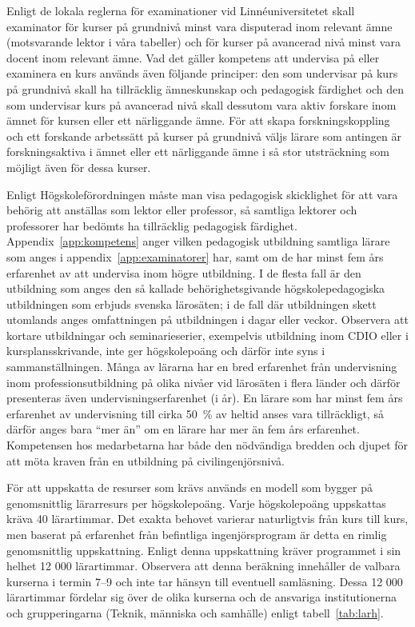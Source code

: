 Enligt de lokala reglerna för examinationer vid Linnéuniversitetet skall examinator för kurser på grundnivå minst vara disputerad inom relevant ämne (motsvarande lektor i våra tabeller) och för kurser på avancerad nivå minst vara docent inom relevant ämne. Vad det gäller kompetens att undervisa på eller examinera en kurs används även följande principer: den som undervisar på kurs på grundnivå skall ha tillräcklig ämneskunskap och pedagogisk färdighet och den som undervisar kurs på avancerad nivå skall dessutom vara aktiv forskare inom ämnet för kursen eller ett närliggande ämne. För att skapa forskningskoppling och ett forskande arbetssätt på kurser på grundnivå väljs lärare som antingen är forskningsaktiva i ämnet eller ett närliggande ämne i så stor utsträckning som möjligt även för dessa kurser.

Enligt Högskoleförordningen måste man visa pedagogisk skicklighet för att vara behörig att anställas som lektor eller professor, så samtliga lektorer och professorer har bedömts ha tillräcklig pedagogisk färdighet. Appendix~\ref{app:kompetens} anger vilken pedagogisk utbildning samtliga lärare som anges i appendix~\ref{app:examinatorer} har, samt om de har minst fem års erfarenhet av att undervisa inom högre utbildning. I de flesta fall är den utbildning som anges den så kallade behörighetsgivande högskolepedagogiska utbildningen som erbjuds svenska lärosäten; i de fall där utbildningen skett utomlands anges omfattningen på utbildningen i dagar eller veckor. Observera att kortare utbildningar och seminarieserier, exempelvis utbildning inom CDIO eller i kursplansskrivande, inte ger högskolepoäng och därför inte syns i sammanställningen. Många av lärarna har en bred erfarenhet från undervisning inom professionsutbildning på olika nivåer vid lärosäten i flera länder och därför presenteras även undervisningserfarenhet (i år). En lärare som har minst fem års erfarenhet av undervisning till cirka 50~\% av heltid anses vara tillräckligt, så därför anges bara ``mer än'' om en lärare har mer än fem års erfarenhet. Kompetensen hos medarbetarna har både den nödvändiga bredden och djupet för att möta kraven från en utbildning på civilingenjörsnivå.

För att uppskatta de resurser som krävs används en modell som bygger på genomsnittlig lärarresurs per högskolepoäng. Varje högskolepoäng uppskattas kräva 40 lärartimmar. Det exakta behovet varierar naturligtvis från kurs till kurs, men baserat på erfarenhet från befintliga ingenjörsprogram är detta en rimlig genomsnittlig uppskattning. Enligt denna uppskattning kräver programmet i sin helhet 12 000 lärartimmar. Observera att denna beräkning innehåller de valbara kurserna i termin 7–9 och inte tar hänsyn till eventuell samläsning. Dessa 12 000 lärartimmar fördelar sig över de olika kurserna och de ansvariga institutionerna och grupperingarna (Teknik, människa och samhälle) enligt tabell~\ref{tab:larh}. 

